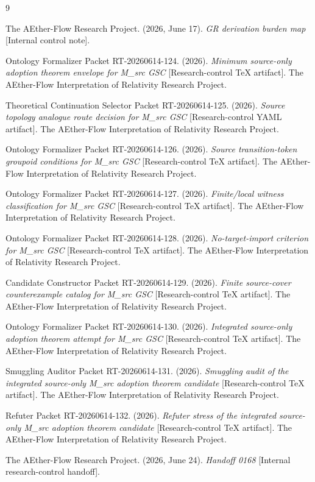 \documentclass[11pt]{article}
\begin{document}
\begin{thebibliography}{9}

The AEther-Flow Research Project. (2026, June 17). \emph{GR derivation burden
map} [Internal control note].

Ontology Formalizer Packet RT-20260614-124. (2026). \emph{Minimum source-only
adoption theorem envelope for M\_src GSC} [Research-control TeX artifact].
The AEther-Flow Interpretation of Relativity Research Project.

Theoretical Continuation Selector Packet RT-20260614-125. (2026). \emph{Source
topology analogue route decision for M\_src GSC} [Research-control YAML
artifact]. The AEther-Flow Interpretation of Relativity Research Project.

Ontology Formalizer Packet RT-20260614-126. (2026). \emph{Source
transition-token groupoid conditions for M\_src GSC} [Research-control TeX
artifact]. The AEther-Flow Interpretation of Relativity Research Project.

Ontology Formalizer Packet RT-20260614-127. (2026). \emph{Finite/local witness
classification for M\_src GSC} [Research-control TeX artifact]. The
AEther-Flow Interpretation of Relativity Research Project.

Ontology Formalizer Packet RT-20260614-128. (2026). \emph{No-target-import
criterion for M\_src GSC} [Research-control TeX artifact]. The AEther-Flow
Interpretation of Relativity Research Project.

Candidate Constructor Packet RT-20260614-129. (2026). \emph{Finite
source-cover counterexample catalog for M\_src GSC} [Research-control TeX
artifact]. The AEther-Flow Interpretation of Relativity Research Project.

Ontology Formalizer Packet RT-20260614-130. (2026). \emph{Integrated
source-only adoption theorem attempt for M\_src GSC} [Research-control TeX
artifact]. The AEther-Flow Interpretation of Relativity Research Project.

Smuggling Auditor Packet RT-20260614-131. (2026). \emph{Smuggling audit of
the integrated source-only M\_src adoption theorem candidate}
[Research-control TeX artifact]. The AEther-Flow Interpretation of Relativity
Research Project.

Refuter Packet RT-20260614-132. (2026). \emph{Refuter stress of the
integrated source-only M\_src adoption theorem candidate} [Research-control
TeX artifact]. The AEther-Flow Interpretation of Relativity Research Project.

The AEther-Flow Research Project. (2026, June 24). \emph{Handoff 0168}
[Internal research-control handoff].

\end{thebibliography}
\end{document}
